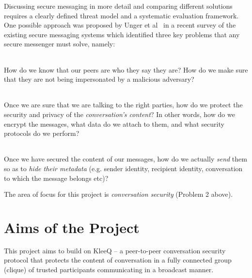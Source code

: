\documentclass[a4paper, 12pt]{report}
\begin{document}
Discussing secure messaging in more detail and comparing different solutions requires a clearly defined threat model and a systematic evaluation framework. One possible approach was proposed by Unger et al~\cite{unger2015sok} in a recent survey of the existing secure messaging systems which identified three key problems that any secure messenger must solve, namely:


\begin{description}[labelindent=0.5cm, leftmargin=1.3cm, rightmargin=0.5cm]
    \item[Problem 1: Trust Establishment]\hfill \\
        How do we know that our peers are who they say they are? How do we make sure that they are not being impersonated by a malicious adversary?
    \item[Problem 2: Conversation Security]\hfill \\
        Once we are sure that we are talking to the right parties, how do we protect the security and privacy of the \emph{conversation's content}? In other words, how do we encrypt the messages, what data do we attach to them, and what security protocols do we perform?
    \item[Problem 3: Transport Privacy]\hfill \\
        Once we have secured the content of our messages, how do we actually \emph{send} them so as to \emph{hide their metadata} (e.g. sender identity, recipient identity, conversation to which the message belongs etc)?
\end{description}
The area of focus for this project is \emph{conversation security} (Problem 2 above).

\section{Aims of the Project}
\label{sec:intro.aims}
This project aims to build on KleeQ \cite{reardon2007kleeq} -- a peer-to-peer conversation security protocol that protects the content of conversation in a fully connected group (clique) of trusted participants communicating in a broadcast manner. \\
\end{document}
